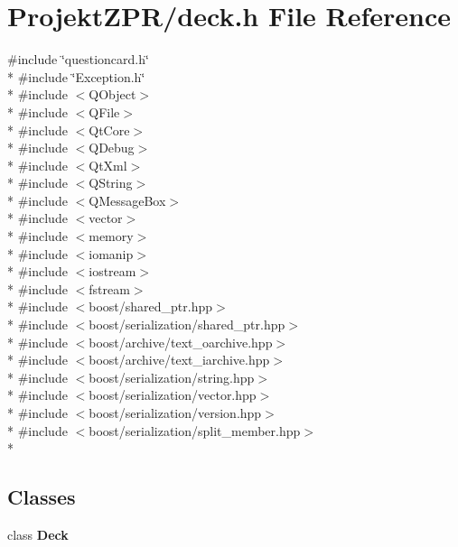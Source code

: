 \section{Projekt\-Z\-P\-R/deck.h File Reference}
\label{deck_8h}
{\ttfamily \#include \char`\"{}questioncard.\-h\char`\"{}}\\*
{\ttfamily \#include \char`\"{}Exception.\-h\char`\"{}}\\*
{\ttfamily \#include $<$Q\-Object$>$}\\*
{\ttfamily \#include $<$Q\-File$>$}\\*
{\ttfamily \#include $<$Qt\-Core$>$}\\*
{\ttfamily \#include $<$Q\-Debug$>$}\\*
{\ttfamily \#include $<$Qt\-Xml$>$}\\*
{\ttfamily \#include $<$Q\-String$>$}\\*
{\ttfamily \#include $<$Q\-Message\-Box$>$}\\*
{\ttfamily \#include $<$vector$>$}\\*
{\ttfamily \#include $<$memory$>$}\\*
{\ttfamily \#include $<$iomanip$>$}\\*
{\ttfamily \#include $<$iostream$>$}\\*
{\ttfamily \#include $<$fstream$>$}\\*
{\ttfamily \#include $<$boost/shared\-\_\-ptr.\-hpp$>$}\\*
{\ttfamily \#include $<$boost/serialization/shared\-\_\-ptr.\-hpp$>$}\\*
{\ttfamily \#include $<$boost/archive/text\-\_\-oarchive.\-hpp$>$}\\*
{\ttfamily \#include $<$boost/archive/text\-\_\-iarchive.\-hpp$>$}\\*
{\ttfamily \#include $<$boost/serialization/string.\-hpp$>$}\\*
{\ttfamily \#include $<$boost/serialization/vector.\-hpp$>$}\\*
{\ttfamily \#include $<$boost/serialization/version.\-hpp$>$}\\*
{\ttfamily \#include $<$boost/serialization/split\-\_\-member.\-hpp$>$}\\*
\subsection*{Classes}
\begin{DoxyCompactItemize}
\item 
class {\bf Deck}
\end{DoxyCompactItemize}
